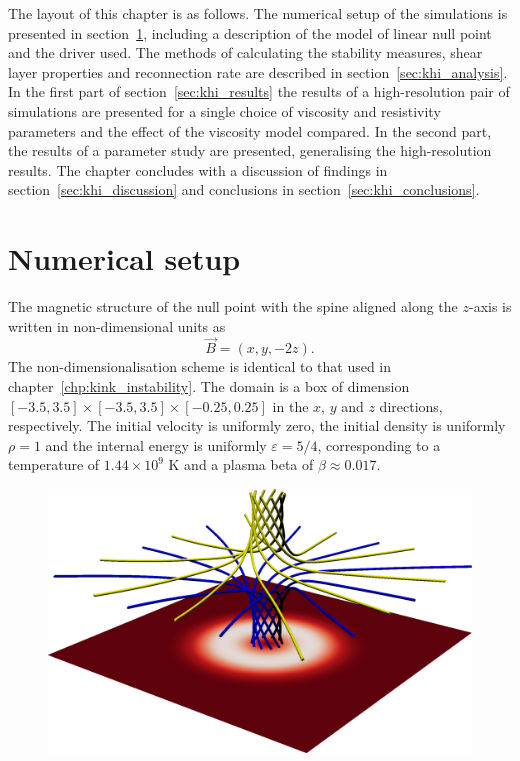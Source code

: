 The layout of this chapter is as follows. The numerical setup of the simulations is presented in section~\ref{sec:khi_numerical_setup}, including a description of the model of linear null point and the driver used. The methods of calculating the stability measures, shear layer properties and reconnection rate are described in section~\ref{sec:khi_analysis}. In the first part of section~\ref{sec:khi_results} the results of a high-resolution pair of simulations are presented for a single choice of viscosity and resistivity parameters and the effect of the viscosity model compared. In the second part, the results of a parameter study are presented, generalising the high-resolution results. The chapter concludes with a discussion of findings in section~\ref{sec:khi_discussion} and conclusions in section~\ref{sec:khi_conclusions}.

\section{Numerical setup}

\label{sec:khi_numerical_setup}

The magnetic structure of the null point with the spine aligned along the $z$-axis is written in non-dimensional units as
\begin{equation}
  \label{eq:null_point_field}
  \vec{B} = (x, y, -2z).
\end{equation}
The non-dimensionalisation scheme is identical to that used in chapter~\ref{chp:kink_instability}. The domain is a box of dimension $[-3.5, 3.5]\times[-3.5, 3.5]\times [-0.25, 0.25] $ in the $x$, $y$ and $z$ directions, respectively. The initial velocity is uniformly zero, the initial density is uniformly $\rho = 1$ and the internal energy is uniformly $\varepsilon = 5/4$, corresponding to a temperature of $1.44 \times 10^9$ K and a plasma beta of $\beta \approx 0.017$.

\begin{figure}[t]
  \centering
      \includegraphics[width=0.5\linewidth]{field_line_plots/cropped/v-4r-4-isotropic_0008_cropped.png}
  \label{fig:field_line_plots/v-4r-4-iso-field-8}
\end{figure}

